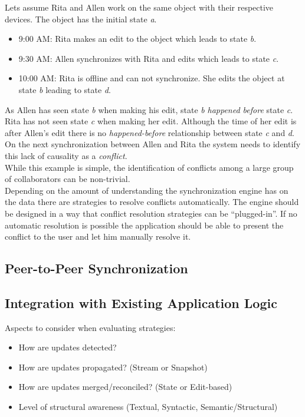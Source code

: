 Lets assume Rita and Allen work on the same object with their respective devices. The object has the initial state \emph{a}.

\begin{itemize}
\item 9:00 AM: Rita makes an edit to the object which leads to state \emph{b}.
\item 9:30 AM: Allen synchronizes with Rita and edits which leads to state \emph{c}.
\item 10:00 AM: Rita is offline and can not synchronize. She edits the object at state \emph{b} leading to state \emph{d}. 
\end{itemize}

As Allen has seen state \emph{b} when making his edit, state \emph{b} \emph{happened before} state \emph{c}.\\
Rita has not seen state \emph{c} when making her edit. Although the time of her edit is after Allen's edit there is no \emph{happened-before} relationship between state \emph{c} and \emph{d}.\\
On the next synchronization between Allen and Rita the system needs to identify this lack of causality as a \emph{conflict}.\\
While this example is simple, the identification of conflicts among a large group of collaborators can be non-trivial.\\
Depending on the amount of understanding the synchronization engine has on the data there are strategies to resolve conflicts automatically. The engine should be designed in a way that conflict resolution strategies can be ``plugged-in''. If no automatic resolution is possible the application should be able to present the conflict to the user and let him manually resolve it.

\subsection{Peer-to-Peer Synchronization}

\subsection{Integration with Existing Application Logic}


Aspects to consider when evaluating strategies:

\begin{itemize}
\item How are updates detected?
\item How are updates propagated? (Stream or Snapshot)
\item How are updates merged/reconciled? (State or Edit-based)
\item Level of structural awareness (Textual, Syntactic, Semantic/Structural)
\end{itemize}

